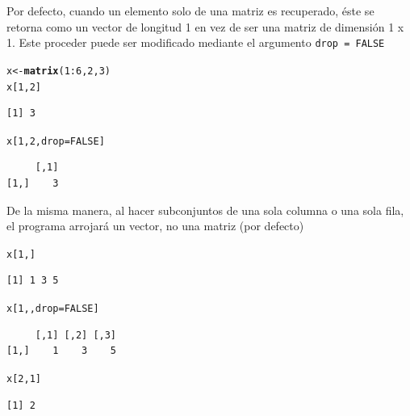 \documentclass{article}\usepackage[]{graphicx}\usepackage[]{color}
\makeatletter
\newcommand{\hlnum}[1]{\textcolor[rgb]{0.686,0.059,0.569}{#1}}%
\newcommand{\hlopt}[1]{\textcolor[rgb]{0,0,0}{#1}}%
\newcommand{\hlstd}[1]{\textcolor[rgb]{0.345,0.345,0.345}{#1}}%
\newcommand{\hlkwb}[1]{\textcolor[rgb]{0.69,0.353,0.396}{#1}}%
\newcommand{\hlkwc}[1]{\textcolor[rgb]{0.333,0.667,0.333}{#1}}%
\newcommand{\hlkwd}[1]{\textcolor[rgb]{0.737,0.353,0.396}{\textbf{#1}}}%
\newenvironment{kframe}{%
 \def\at@end@of@kframe{}%
 \ifinner\ifhmode%
  \def\at@end@of@kframe{\end{minipage}}%
  \begin{minipage}{\columnwidth}%
 \fi\fi%
 \def\FrameCommand##1{\hskip\@totalleftmargin \hskip-\fboxsep
 \colorbox{shadecolor}{##1}\hskip-\fboxsep
     \hskip-\linewidth \hskip-\@totalleftmargin \hskip\columnwidth}%
 \MakeFramed {\advance\hsize-\width
   \@totalleftmargin\z@ \linewidth\hsize
   \@setminipage}}%
 {\par\unskip\endMakeFramed%
 \at@end@of@kframe}
\newenvironment{knitrout}{}{} %
\makeatother
\begin{document}
    Por defecto, cuando un elemento solo de una matriz es recuperado, éste se retorna como un vector de longitud 1 en vez de ser una matriz de dimensión 1 x 1. Este proceder puede ser modificado mediante el argumento \texttt{drop = FALSE}
\begin{knitrout}
\color{fgcolor}\begin{kframe}
\begin{alltt}
  \hlstd{x} \hlkwb{<-} \hlkwd{matrix}\hlstd{(}\hlnum{1}\hlopt{:}\hlnum{6}\hlstd{,} \hlnum{2}\hlstd{,} \hlnum{3}\hlstd{)}
  \hlstd{x[}\hlnum{1}\hlstd{,} \hlnum{2}\hlstd{]}
\end{alltt}
\begin{verbatim}
[1] 3
\end{verbatim}
\begin{alltt}
  \hlstd{x[}\hlnum{1}\hlstd{,} \hlnum{2}\hlstd{,} \hlkwc{drop} \hlstd{=} \hlnum{FALSE}\hlstd{]}
\end{alltt}
\begin{verbatim}
     [,1]
[1,]    3
\end{verbatim}
\end{kframe}
\end{knitrout}

    De la misma manera, al hacer subconjuntos de una sola columna o una sola fila, el programa arrojará un vector, no una matriz (por defecto)
\begin{knitrout}
\color{fgcolor}\begin{kframe}
\begin{alltt}
  \hlstd{x[}\hlnum{1}\hlstd{, ]}
\end{alltt}
\begin{verbatim}
[1] 1 3 5
\end{verbatim}
\begin{alltt}
  \hlstd{x[}\hlnum{1}\hlstd{, ,} \hlkwc{drop} \hlstd{=} \hlnum{FALSE}\hlstd{]}
\end{alltt}
\begin{verbatim}
     [,1] [,2] [,3]
[1,]    1    3    5
\end{verbatim}
\begin{alltt}
  \hlstd{x[}\hlnum{2}\hlstd{,}\hlnum{1}\hlstd{]}
\end{alltt}
\begin{verbatim}
[1] 2
\end{verbatim}
\end{kframe}
\end{knitrout}
\end{document}
